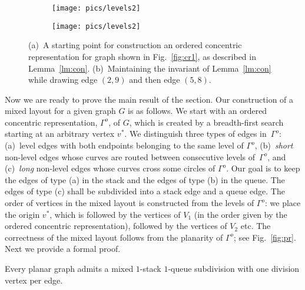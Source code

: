 \documentclass[orivec]{llncs}
\newcommand{\df}[1]{{\it #1}}
\newcounter{dummycount}
\newenvironment{backInTimeThm}[1]{
    \setcounter{dummycount}{\value{theorem}}
    \setcounter{theorem}{\value{#1}}}
{\setcounter{theorem}{\value{dummycount}}}
\begin{document}
\begin{figure}[t]
    \centering
    \begin{subfigure}[b]{.48\linewidth}
        \texttt{[image: pics/levels2]}
        \caption{}
        \label{fig:con1}
    \end{subfigure}
\hfill
    \begin{subfigure}[b]{.48\linewidth}
        \texttt{[image: pics/levels2]}
        \caption{}
        \label{fig:con2}
    \end{subfigure}
    \caption{(a)~A starting point for construction an ordered concentric representation for graph shown
        in Fig.~\ref{fig:cr1}, as described in Lemma~\ref{lm:con}.
        (b)~Maintaining the invariant of Lemma~\ref{lm:con} while drawing edge $(2,9)$ and then edge $(5,8)$.}
    \label{fig:con}
\end{figure}


Now we are ready to prove the main result of the section. Our construction
of a mixed layout for a given graph $G$ is as follows. We start with an ordered concentric representation, $\Gamma^o$, of $G$, which
is created by a breadth-first search starting at an arbitrary vertex $v^*$. We distinguish three types of edges in~$\Gamma^o$:
(a)~level edges with both endpoints belonging to the same level of $\Gamma^o$, 
(b)~\df{short} non-level edges whose curves are routed between consecutive levels of~$\Gamma^o$, and
(c)~\df{long} non-level edges whose curves cross some circles of $\Gamma^o$.
Our goal is to keep the edges of type (a) in the stack and the
edges of type (b) in the queue. The edges of type
(c) shall be subdivided into a stack edge and a queue edge. The order of vertices in the mixed
layout is constructed from the levels of $\Gamma^o$: we place the origin $v^*$, which is followed by 
the vertices of $V_1$ (in the order given by the ordered concentric representation), followed by the
vertices of $V_2$ etc. The correctness of the mixed layout follows from the planarity of $\Gamma^o$; see Fig.~\ref{fig:pr}.
Next we provide a formal proof.

\begin{backInTimeThm}{thm-11}
    \begin{theorem}
        Every planar graph admits a mixed $1$-stack $1$-queue subdivision with one division vertex per edge.
    \end{theorem}
\end{backInTimeThm}
\end{document}

